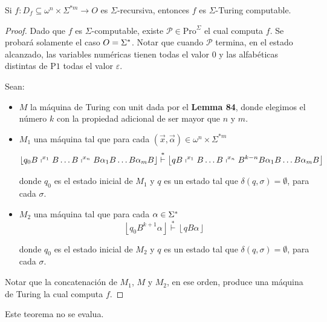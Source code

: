   \pagebreak
	\begin{theorem}
		\PN Si $f: D_{f} \subseteq \omega^{n} \times \Sigma^{\ast m} \rightarrow O$ es $\Sigma$-recursiva, entonces $f$ es
    $\Sigma$-Turing computable.
  \end{theorem}
  \begin{proof}
    \PN Dado que $f$ es $\Sigma$-computable, existe $\mathcal{P} \in \mathrm{Pro}^{\Sigma}$ el cual computa $f$. Se
    probará solamente el caso $O = \Sigma^{\ast}$. Notar que cuando $\mathcal{P}$ termina, en el estado alcanzado, las
    variables numéricas tienen todas el valor $0$ y las alfabéticas distintas de $\mathrm{P}1$ todas el valor
    $\varepsilon$.

    \PN Sean:
    \begin{itemize}
      \item $M$ la máquina de Turing con unit dada por el \textbf{Lemma 84}, donde elegimos el número $k$ con la
        propiedad adicional de ser mayor que $n$ y $m$.

      \item $M_{1}$ una máquina tal que para cada $(\vec{x},\vec{\alpha}) \in \omega^{n} \times \Sigma^{\ast m}$
      	\[
          \left\lfloor q_{0} B \shortmid^{x_{1}} B \dotsc B \shortmid^{x_{n}} B \alpha_{1} B \dotsc B \alpha_{m} B
          \right\rfloor \overset{\ast}{\vdash}\left\lfloor q B \shortmid^{x_{1}} B \dotsc B \shortmid^{x_{n}}
          B^{k-n} B \alpha_{1} B \dotsc B \alpha_{m} B \right\rfloor
      	\]

        \PN donde $q_{0}$ es el estado inicial de $M_{1}$ y $q$ es un estado tal que $\delta(q,\sigma) =
        \emptyset$, para cada $\sigma$.

      \item $M_{2}$ una máquina tal que para cada $\alpha \in \Sigma^{\ast}$
      	\[
          \left\lfloor q_{0} B^{k+1} \alpha \right\rfloor \overset{\ast}{\vdash} \left\lfloor q B \alpha
          \right\rfloor
      	\]

        \PN donde $q_{0}$ es el estado inicial de $M_{2}$ y $q$ es un estado tal que $\delta(q,\sigma) =
        \emptyset$, para cada $\sigma$.
    \end{itemize}

    \PN Notar que la concatenación de $M_{1}$, $M$ y $M_{2}$, en ese orden, produce una máquina de Turing la cual
    computa $f$.
	\end{proof}

  \begin{theorem}
    \PN Este teorema no se evalua.
  \end{theorem}
